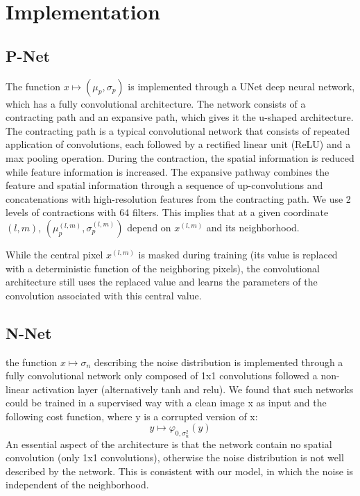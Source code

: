 \documentclass[review]{cvpr}
\begin{document}

%

\section{Implementation}
\subsection{P-Net}
The function $x\mapsto (\mu_p , \sigma_p)$ is implemented through a UNet \cite{ronneberger2015u} deep neural network, which has a fully convolutional architecture. 
The network consists of a contracting path and an expansive path, which gives it the u-shaped architecture. The contracting path is a typical convolutional network that consists of repeated application of convolutions, each followed by a rectified linear unit (ReLU) and a max pooling operation. During the contraction, the spatial information is reduced while feature information is increased. The expansive pathway combines the feature and spatial information through a sequence of up-convolutions and concatenations with high-resolution features from the contracting path.
We use 2 levels of contractions with 64 filters. 
This implies that at a given coordinate $(l,m)$, $(\mu_p^{(l,m)}, \sigma_p^{(l,m)})$ depend on $x^{(l,m)}$ and its neighborhood.

While the central pixel $x^{(l,m)}$ is masked during training (its value is replaced with a deterministic function of the neighboring pixels), the convolutional architecture still uses the replaced value and learns the parameters of the convolution associated with this central value.

\subsection{N-Net}
the function $x\mapsto \sigma_n$ describing the noise distribution is implemented through a fully convolutional network only composed of 1x1 convolutions followed a non-linear activation layer (alternatively tanh and relu). 
We found that such networks could be trained in a supervised way with a clean image x as input and the following cost function, where y is a corrupted version of x: 
$$
y\mapsto \varphi_{0,\sigma_n^2}(y)
$$
An essential aspect of the architecture is that the network contain no spatial convolution (only 1x1 convolutions), otherwise the noise distribution is not well described by the network. This is consistent with our model, in which the noise is independent of the neighborhood.
\end{document}
